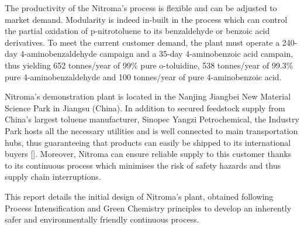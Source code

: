 The productivity of the Nitroma's process is flexible and can be adjusted to market demand. Modularity is indeed in-built in the process which can control the partial oxidation of p-nitrotoluene to its benzaldehyde or benzoic acid derivatives. To meet the current customer demand, the plant must operate a 240-day 4-aminobenzaldehyde campaign and a 35-day 4-aminobenzoic acid campain, thus yielding 652 tonnes/year of 99\% pure o-toluidine, 538 tonnes/year of 99.3\% pure 4-aminobenzaldehyde and 100 tonnes/year of pure 4-aminobenzoic acid.

Nitroma's demonstration plant is located in the Nanjing Jiangbei New Material Science Park in Jiangsu (China). In addition to secured feedstock supply from China’s largest toluene manufacturer, Sinopec Yangzi Petrochemical, the Industry Park hosts all the necessary utilities and is well connected to main transportation hubs, thus guaranteeing that products can easily be shipped to its international buyers []. Moreover, Nitroma can ensure reliable supply to this customer thanks to its continuous process which minimises the risk of safety hazards and thus supply chain interruptions.





This report details the initial design of Nitroma's plant, obtained following Process Intensification and Green Chemistry principles to develop an inherently safer and environmentally friendly continuous process.



